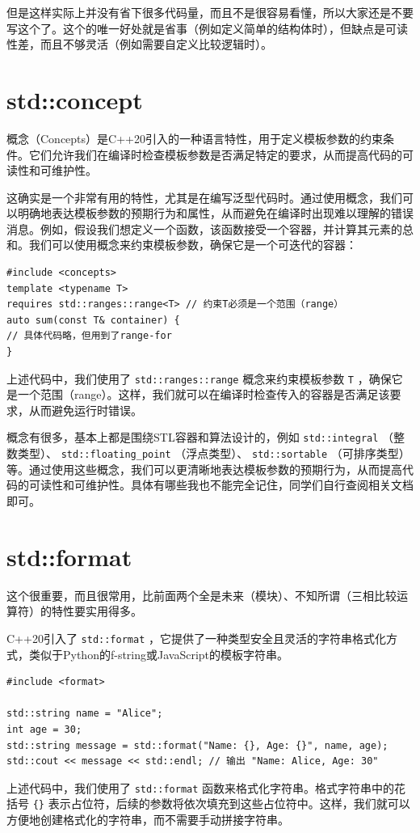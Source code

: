 但是这样实际上并没有省下很多代码量，而且不是很容易看懂，所以大家还是不要写这个了。这个的唯一好处就是省事（例如定义简单的结构体时），但缺点是可读性差，而且不够灵活（例如需要自定义比较逻辑时）。

\section{std::concept}

概念（Concepts）是C++20引入的一种语言特性，用于定义模板参数的约束条件。它们允许我们在编译时检查模板参数是否满足特定的要求，从而提高代码的可读性和可维护性。

这确实是一个非常有用的特性，尤其是在编写泛型代码时。通过使用概念，我们可以明确地表达模板参数的预期行为和属性，从而避免在编译时出现难以理解的错误消息。例如，假设我们想定义一个函数，该函数接受一个容器，并计算其元素的总和。我们可以使用概念来约束模板参数，确保它是一个可迭代的容器：
\begin{verbatim}
#include <concepts>
template <typename T>
requires std::ranges::range<T> // 约束T必须是一个范围（range）
auto sum(const T& container) {
// 具体代码略，但用到了range-for
}
\end{verbatim}
上述代码中，我们使用了 \verb|std::ranges::range| 概念来约束模板参数 \verb|T| ，确保它是一个范围（range）。这样，我们就可以在编译时检查传入的容器是否满足该要求，从而避免运行时错误。

概念有很多，基本上都是围绕STL容器和算法设计的，例如 \verb|std::integral| （整数类型）、 \verb|std::floating_point| （浮点类型）、 \verb|std::sortable| （可排序类型）等。通过使用这些概念，我们可以更清晰地表达模板参数的预期行为，从而提高代码的可读性和可维护性。具体有哪些我也不能完全记住，同学们自行查阅相关文档即可。

\section{std::format}

这个很重要，而且很常用，比前面两个全是未来（模块）、不知所谓（三相比较运算符）的特性要实用得多。

C++20引入了 \verb|std::format| ，它提供了一种类型安全且灵活的字符串格式化方式，类似于Python的f-string或JavaScript的模板字符串。

\begin{verbatim}
#include <format>

std::string name = "Alice";
int age = 30;
std::string message = std::format("Name: {}, Age: {}", name, age);
std::cout << message << std::endl; // 输出 "Name: Alice, Age: 30"
\end{verbatim}
上述代码中，我们使用了 \verb|std::format| 函数来格式化字符串。格式字符串中的花括号 \verb|{}| 表示占位符，后续的参数将依次填充到这些占位符中。这样，我们就可以方便地创建格式化的字符串，而不需要手动拼接字符串。

